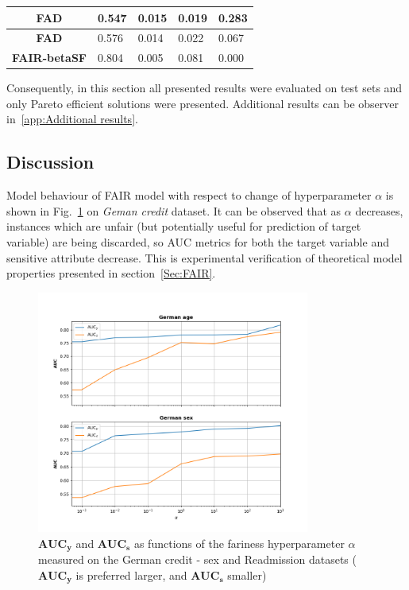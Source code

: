 \documentclass[preprint,12pt]{elsarticle}
\begin{document}
\begin{table}
\begin{tabular}{|c|l|l|l|l|}
		\textbf{FAD}           & 0.547                             & 0.015                             & 0.019                             & 0.283                              \\ \hline
		\textbf{FAD}           & 0.576                             & 0.014                             & 0.022                             & 0.067                              \\ \hline
		\textbf{FAIR-betaSF}   & 0.804                             & 0.005                             & 0.081                             & 0.000                              \\ \hline
	\end{tabular}
	\label{tab:Ger-sex}%
\end{table}

Consequently, in this section all presented results were evaluated on test sets and only Pareto efficient solutions were presented. Additional results can be observer in~\ref{app:Additional results}.

\subsection{Discussion}

Model behaviour of FAIR model with respect to change of hyperparameter $\alpha$ is shown in Fig.~\ref{fig:FigResultsAlpha} on \textit{Geman credit} dataset. It can be observed that as $\alpha$ decreases, instances which are unfair (but potentially useful for prediction of target variable) are being discarded, so AUC metrics for both the target variable and sensitive attribute decrease. This is experimental verification of theoretical model properties presented in section~\ref{Sec:FAIR}.

\begin{figure}[h]
	\center
	\includegraphics[angle=0, width=0.8\textwidth]{AUC_y_A.png}
	\captionsetup{justification=centering}
	\caption{$\mathbf{AUC_y}$ and $\mathbf{AUC_s}$ as functions of the fariness hyperparameter $\alpha$ measured on the  German credit - sex and Readmission datasets ($\mathbf{AUC_y}$ is preferred larger, and $\mathbf{AUC_s}$ smaller)}
	\label{fig:FigResultsAlpha}
\end{figure}
\end{document}
